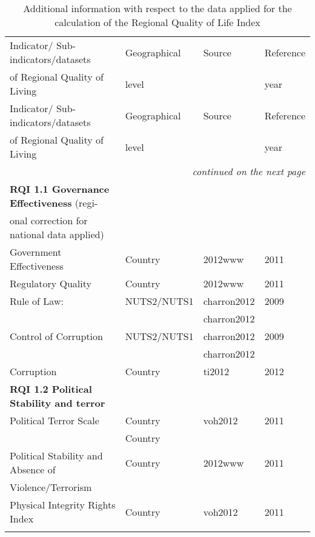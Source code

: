 \documentclass[a4paper,twoside]{article}
\begin{document}
{\footnotesize
\begin{longtable}{llll}
\caption{Additional information with respect to the data applied for the calculation of the Regional Quality of Life Index} \label{tab:A1} \\
\toprule
Indicator/ Sub-indicators/datasets & Geographical & Source & Reference \\
of Regional Quality of Living      & level        &        & year      \\
\midrule 
\endfirsthead
\toprule 
Indicator/ Sub-indicators/datasets & Geographical & Source & Reference \\
of Regional Quality of Living      & level        &        & year      \\
\midrule 
\endhead
\bottomrule  
\multicolumn{4}{r}{\emph{continued on the next page}}
\endfoot
\bottomrule 
\endlastfoot
    {\bf RQI 1  Governance} &       &      &   \\
    {\bf RQI 1.1 Governance Effectiveness} (regi- &       &       &  \\
    onal correction for national data applied) &       &       &  \\
    Government Effectiveness & Country & 2012www & 2011 \\
    Regulatory Quality       & Country & 2012www & 2011 \\
    Rule of Law: & NUTS2/NUTS1 & charron2012            & 2009 \\
                 &             & charron2012              &      \\
    Control of Corruption & NUTS2/NUTS1 & charron2012   & 2009 \\
                          &             & charron2012     &      \\
    Corruption            & Country     & ti2012             & 2012 \\[3mm]
    {\bf RQI 1.2 Political Stability and terror} &       &       &  \\
    Political Terror Scale & Country    & voh2012       & 2011 \\
                           & Country    &          &  \\
    Political Stability and Absence of & Country & 2012www & 2011 \\
    Violence/Terrorism &  &  &  \\
    Physical Integrity Rights Index & Country & voh2012 & 2011 \\
     &  &       &  \\

\end{longtable}}
\end{document}
